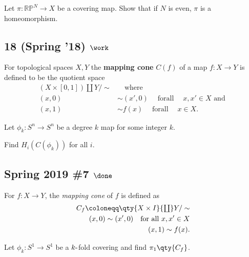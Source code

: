 Let \(\pi :{\mathbb{RP}}^N \to X\) be a covering map. Show that if \(N\)
is even, \(\pi\) is a homeomorphism.

\hypertarget{spring-18-work-1}{%
\subsection{\texorpdfstring{18 (Spring '18)
\(\work\)}{18 (Spring '18) \textbackslash work}}\label{spring-18-work-1}}

For topological spaces \(X, Y\) the \textbf{mapping cone} \(C(f )\) of a
map \(f : X \to Y\) is defined to be the quotient space
\begin{align*}  
(X \times [0, 1]){\textstyle\coprod}Y / \sim &{\quad \operatorname{where} \quad}  \\ 
(x, 0) &\sim (x', 0) {\quad \operatorname{for all} \quad} x, x' \in X \text{ and } \\ 
(x, 1) &\sim f (x) {\quad \operatorname{for all } \quad} x \in X
.\end{align*}

Let \(\phi_k : S^n \to S^n\) be a degree \(k\) map for some integer
\(k\).

Find \(H_i(C(\phi_k ))\) for all \(i\).

\hypertarget{spring-2019-7-done}{%
\subsection{\texorpdfstring{Spring 2019 \#7
\(\done\)}{Spring 2019 \#7 \textbackslash done}}\label{spring-2019-7-done}}

For \(f:X\to Y\), the \emph{mapping cone} of \(f\) is defined as
\begin{align*}  
C_f \coloneqq\qty{X\times I} {\textstyle\coprod}Y/\sim \\
(x, 0) \sim (x', 0) \quad \text{for all }x, x'\in X\\
(x, 1) \sim f(x)
.\end{align*}

Let \(\phi_k: S^1\to S^1\) be a \(k{\hbox{-}}\)fold covering and find
\(\pi_1\qty{C_f}\).


